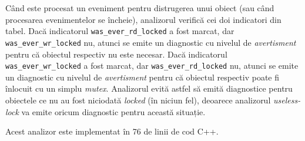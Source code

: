 Când este procesat un eveniment pentru distrugerea unui obiect (sau când
procesarea evenimentelor se încheie), analizorul verifică cei doi
indicatori din tabel. Dacă indicatorul \lstinline{was_ever_rd_locked}
a fost marcat, dar \lstinline{was_ever_wr_locked} nu, atunci se emite un
diagnostic cu nivelul de \textit{avertisment} pentru că obiectul
respectiv nu este necesar. Dacă indicatorul
\lstinline{was_ever_wr_locked} a fost marcat, dar
\lstinline{was_ever_rd_locked} nu, atunci se emite un diagnostic cu
nivelul de \textit{avertisment} pentru că obiectul respectiv poate fi
înlocuit cu un simplu \textit{mutex}. Analizorul evită astfel să emită
diagnostice pentru obiectele ce nu au fost niciodată \textit{locked} (în
niciun fel), deoarece analizorul \textit{useless-lock} va emite oricum
diagnostic pentru această situație.

Acest analizor este implementat în 76 de linii de cod C++.
